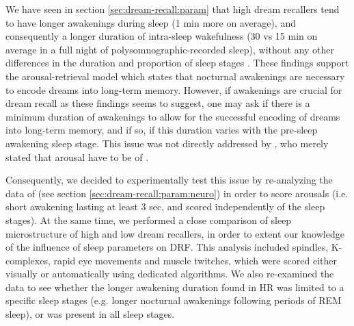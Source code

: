 We have seen in section \ref{sec:dream-recall:param} that high dream recallers tend to have longer awakenings during sleep (1 min more on average), and consequently a longer duration of intra-sleep wakefulness (30 vs 15 min on average in a full night of polysomnographic-recorded sleep), without any other differences in the duration and proportion of sleep stages \citep{eichenlaub_brain_2014}. These findings support the arousal-retrieval model which states that nocturnal awakenings are necessary to encode dreams into long-term memory. However, if awakenings are crucial for dream recall as these findings seems to suggest, one may ask if there is a minimum duration of awakenings to allow for the successful encoding of dreams into long-term memory, and if so, if this duration varies with the pre-sleep awakening sleep stage. This issue was not directly addressed by \citet{koulack_dream_1976}, who merely stated that arousal have to be of .

Consequently, we decided to experimentally test this issue by re-analyzing the data of \citet{eichenlaub_brain_2014} (see section \ref{sec:dream-recall:param:neuro}) in order to score arousals (i.e. short awakening lasting at least 3 sec, and scored independently of the sleep stages). At the same time, we performed a close comparison of sleep microstructure of high and low dream recallers, in order to extent our knowledge of the influence of sleep parameters on DRF. This analysis included spindles, K-complexes, rapid eye movements and muscle twitches, which were scored either visually or automatically using dedicated algorithms. We also re-examined the data to see whether the longer awakening duration found in HR was limited to a specific sleep stages (e.g. longer nocturnal awakenings following periods of REM sleep), or was present in all sleep stages.

